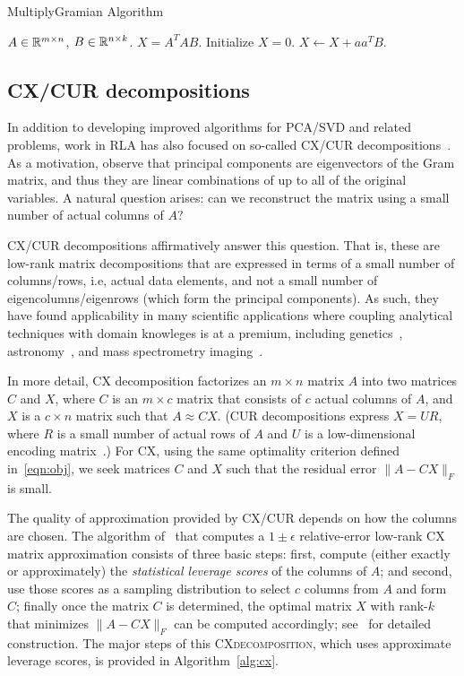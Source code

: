 \begin{algorithm}[tb]
  \caption{{\sc MultiplyGramian} Algorithm}
  \label{alg:gram}
  \begin{algorithmic}[1]
    \Require $A \in \mathbb{R}^{m\times n}$, $B \in \mathbb{R}^{n\times k}$.
    \Ensure $X = A^T A B$.
    \State Initialize $X = 0$.
        \State $X \gets X + a a^T B$.
    \EndFor
  \end{algorithmic}
\end{algorithm}


\subsection{CX/CUR decompositions}

In addition to developing improved algorithms for PCA/SVD and related problems, work in RLA has also focused on so-called CX/CUR decompositions~\cite{DMM08,CUR_PNAS}.
As a motivation, observe that principal components are eigenvectors of the Gram matrix, and thus they are linear combinations of up to all of the original variables. 
A natural question arises: can we reconstruct the matrix using a small number of actual columns of $A$?

CX/CUR decompositions affirmatively answer this question.
That is, these are low-rank matrix decompositions that are expressed in terms of a small number of columns/rows, i.e, actual data elements, and not a small number of eigencolumns/eigenrows (which form the principal components).
As such, they have found applicability in many scientific applications where coupling analytical techniques with domain knowleges is at a premium, including genetics~\cite{Paschou07b}, astronomy~\cite{Yip14-AJ}, and mass spectrometry imaging~\cite{YRPMB15}.

In more detail,
CX decomposition factorizes an $m \times n$ matrix $A$ into two matrices $C$ and $X$, where $C$ is an $m\times c$ matrix that consists of $c$ actual columns
of $A$, and $X$ is a $c \times n$ matrix such that $A\approx CX$.
(CUR decompositions express $X=UR$, where $R$ is a small number of actual rows of $A$ and $U$ is a low-dimensional encoding matrix~\cite{DMM08,CUR_PNAS}.)
For CX, using the same optimality criterion defined in~\eqref{eqn:obj}, we seek matrices $C$ and $X$ such that the residual error $\|A-CX\|_F$ is small.

The quality of approximation provided by CX/CUR depends on how the columns are chosen.
The algorithm of~\cite{DMM08} that computes a $1\pm\epsilon$ relative-error low-rank CX matrix approximation consists of three basic steps: 
first, compute (either exactly or approximately) the {\it statistical leverage scores} of the columns of $A$;
and second, use those scores as a sampling distribution to select $c$ columns from $A$ and form $C$;
finally once the matrix $C$ is determined, the optimal matrix $X$ with rank-$k$ that minimizes $\|A-CX\|_F$ can be computed accordingly; see~\cite{DMM08} for detailed construction.
The major steps of this \textsc{CXdecomposition}, which uses approximate leverage scores, is provided in Algorithm~\ref{alg:cx}.


